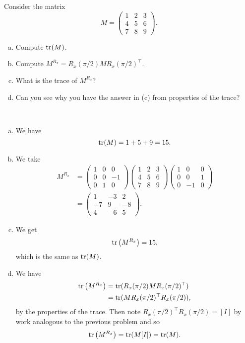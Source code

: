 \documentclass[12pt]{article} %
\begin{document}
\newpage
\begin{problem}
Consider the matrix 
\[
M = \begin{pmatrix} 1 & 2 & 3 \\ 4 & 5 & 6 \\ 7 & 8 & 9 \end{pmatrix}.
\]
\begin{enumerate}[(a)]
    \item Compute $\mathrm{tr}(M)$. 
    \item Compute $M^{R_x}=R_x(\pi/2)MR_x(\pi/2)^\top$.
    \item What is the trace of $M^{R_x}$?
    \item Can you see why you have the answer in (c) from properties of the trace?
\end{enumerate}
\end{problem}
\begin{solution}~
\begin{enumerate}[(a)]
    \item We have
    \[
    \mathrm{tr}(M) = 1 + 5 + 9 = 15.
    \]
    \item We take
    \begin{align*}
    M^{R_x} &= \begin{pmatrix} 1 & 0 & 0 \\ 0 & 0 & -1 \\ 0 & 1 & 0 \end{pmatrix} \begin{pmatrix} 1 & 2 & 3 \\ 4 & 5 & 6 \\ 7 & 8 & 9 \end{pmatrix} \begin{pmatrix} 1 & 0 & 0 \\ 0 & 0 & 1 \\ 0 & -1 & 0 \end{pmatrix}\\
    &=\begin{pmatrix} 1 & -3 & 2 \\ -7 & 9 & -8 \\ 4 & -6 & 5 \end{pmatrix}.
    \end{align*}
    \item We get
    \[
    \mathrm{tr}\left( M^{R_x}\right) = 15,
    \]
    which is the same as $\mathrm{tr}(M)$.
    \item We have
    \begin{align*}
        \mathrm{tr}\left(M^{R_x}\right) &= \mathrm{tr}(R_x(\pi/2) M R_x(\pi/2)^\top) \\
        &= \mathrm{tr}(M R_x(\pi/2)^\top R_x(\pi/2)),
    \end{align*}
    by the properties of the trace.  Then note $R_x(\pi/2)^\top R_x(\pi/2)=[I]$ by work analogous to the previous problem and so
    \[
    \mathrm{tr}\left(M^{R_x}\right) = \mathrm{tr}(M[I])=\mathrm{tr}(M).
    \]
\end{enumerate}
\end{solution}
\end{document}
